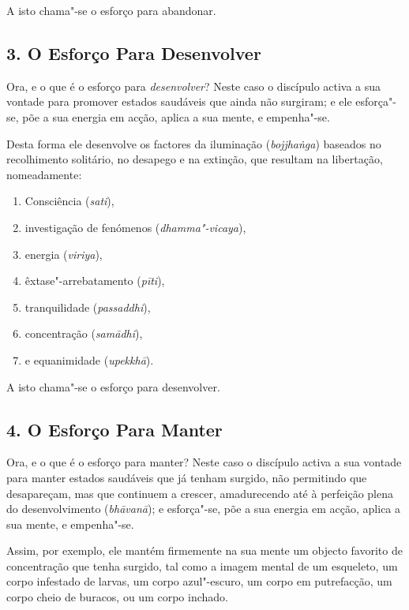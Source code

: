 A isto chama"-se o esforço para abandonar.


\subsection{3. O Esforço Para Desenvolver}


Ora, e o que é o esforço para \emph{desenvolver}? Neste caso o discípulo activa
a sua vontade para promover estados saudáveis que ainda não surgiram; e ele
esforça"-se, põe a sua energia em acção, aplica a sua mente, e empenha"-se.

Desta forma ele desenvolve os factores da iluminação (\emph{bojjhaṅga}) baseados
no recolhimento solitário, no desapego e na extinção, que resultam na
libertação, nomeadamente:

\begin{enumerate}
  \item Consciência (\emph{sati}),
  \item investigação de fenómenos (\emph{dhamma"-vicaya}),
  \item energia (\emph{viriya}),
  \item êxtase"-arrebatamento (\emph{pīti}),
  \item tranquilidade (\emph{passaddhi}),
  \item concentração (\emph{samādhi}),
  \item e equanimidade (\emph{upekkhā}).
\end{enumerate}

A isto chama"-se o esforço para desenvolver.

\subsection{4. O Esforço Para Manter}


Ora, e o que é o esforço para manter? Neste caso o discípulo activa a sua
vontade para manter estados saudáveis que já tenham surgido, não permitindo que
desapareçam, mas que continuem a crescer, amadurecendo até à perfeição plena do
desenvolvimento (\emph{bhāvanā}); e esforça"-se, põe a sua energia em acção,
aplica a sua mente, e empenha"-se.

Assim, por exemplo, ele mantém firmemente na sua mente um objecto favorito de
concentração que tenha surgido, tal como a imagem mental de um esqueleto, um
corpo infestado de larvas, um corpo azul"-escuro, um corpo em putrefacção, um
corpo cheio de buracos, ou um corpo inchado.


